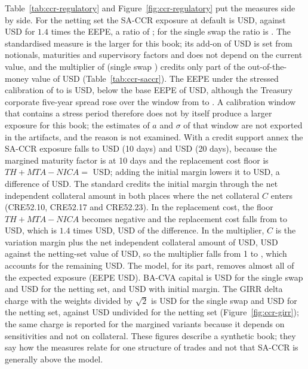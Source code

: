Table~\ref{tab:ccr-regulatory} and Figure~\ref{fig:ccr-regulatory} put the measures side by side. For the netting set the SA-CCR exposure at default is \ccrEadNetting{} USD, against \ccrAlphaEepeNetting{} USD for $1.4$ times the EEPE, a ratio of \ccrRatioEadNetting; for the single swap the ratio is \ccrRatioEadSingle. The standardised measure is the larger for this book; its add-on of
\ccrAddOnNetting{} USD is set from notionals, maturities and supervisory factors and does not depend on the current value, and the multiplier of \ccrMultNetting{} (single swap \ccrMultSingle) credits only part of the out-of-the-money value of \ccrVNetting{} USD (Table~\ref{tab:ccr-saccr}). The EEPE under the stressed calibration of \ccrStressStart{} to \ccrStressEnd{} is \ccrStressedNetting{} USD, below the base EEPE of \ccrEepeNetting{} USD, although the Treasury corporate five-year spread rose
over the window from \ccrStressedSpreadStart{} to \ccrStressedSpreadPeak. A calibration window that contains a stress period therefore does not by itself produce a larger exposure for this book; the estimates of $a$ and $\sigma$ of that window are not exported in the artifacts, and the reason is not examined. With a credit support annex the SA-CCR exposure falls to \ccrEadCsaShort{} USD (10 days) and \ccrEadCsaLong{} USD (20 days), because
the margined maturity factor is \ccrMaturityFactorCsa{} at 10 days and the replacement cost floor is $TH+MTA-NICA=$ \ccrRcCsa{} USD; adding the initial margin lowers it to \ccrEadIm{} USD, a difference of \ccrEadCsaImDiff{} USD. The standard credits the initial margin through the net independent collateral amount in both places where the net collateral $C$ enters (CRE52.10, CRE52.17 and CRE52.23). In the replacement cost, the floor $TH+MTA-NICA$ becomes negative and the replacement cost falls from \ccrRcCsa{} to \ccrRcIm{} USD, which is $1.4$ times \ccrRcCsa{} USD, \ccrAlphaRcCsa{} USD of the difference. In the multiplier, $C$ is the variation margin plus the net independent collateral amount of \ccrNica{} USD, \ccrCIm{} USD against the netting-set value of \ccrVNetting{} USD, so the multiplier falls from 1 to \ccrMultIm{}, which accounts for the remaining \ccrEadMultDiff{} USD. The model, for its part, removes almost all of the expected exposure (EEPE \ccrEepeIm{} USD). BA-CVA capital is \ccrBaCvaSingle{} USD for the single swap and \ccrBaCvaNetting{} USD for the netting set, and \ccrBaCvaIm{} USD with initial margin. The GIRR delta charge with the weights divided by $\sqrt2$ is \ccrGirrSingle{} USD for the single swap and \ccrGirrNetting{} USD for the netting set, against
\ccrGirrUndividedNetting{} USD undivided for the netting set (Figure~\ref{fig:ccr-girr}); the same charge is reported for the margined variants because it depends on sensitivities and not on collateral. These figures describe a synthetic book; they say how the measures relate for one structure of trades and not that SA-CCR is generally above the model.

